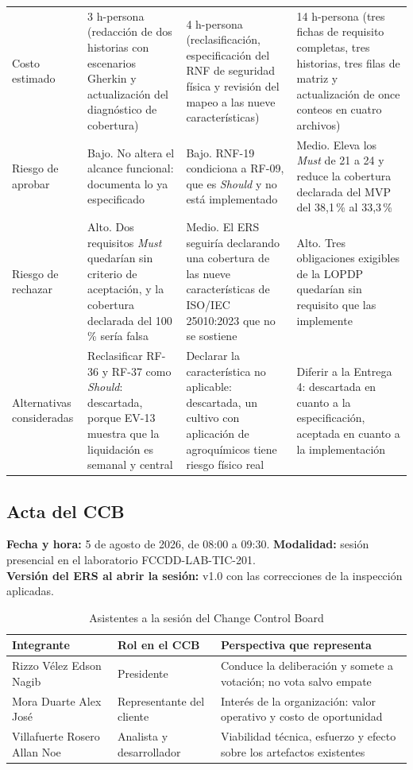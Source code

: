 \documentclass[11pt,letterpaper]{article}
\begin{document}
{\begin{longtable}{L{2.4cm} L{4.4cm} L{4.4cm} L{4.4cm}}
Costo estimado & 3 h-persona (redacción de dos historias con escenarios Gherkin y actualización del diagnóstico de cobertura) & 4 h-persona (reclasificación, especificación del RNF de seguridad física y revisión del mapeo a las nueve características) & 14 h-persona (tres fichas de requisito completas, tres historias, tres filas de matriz y actualización de once conteos en cuatro archivos)\\
Riesgo de aprobar & Bajo. No altera el alcance funcional: documenta lo ya especificado & Bajo. RNF-19 condiciona a RF-09, que es \emph{Should} y no está implementado & Medio. Eleva los \emph{Must} de 21 a 24 y reduce la cobertura declarada del MVP del 38,1\,\% al 33,3\,\%\\
Riesgo de rechazar & Alto. Dos requisitos \emph{Must} quedarían sin criterio de aceptación, y la cobertura declarada del 100\,\% sería falsa & Medio. El ERS seguiría declarando una cobertura de las nueve características de ISO/IEC 25010:2023 que no se sostiene & Alto. Tres obligaciones exigibles de la LOPDP quedarían sin requisito que las implemente\\
Alternativas consideradas & Reclasificar RF-36 y RF-37 como \emph{Should}: descartada, porque EV-13 muestra que la liquidación es semanal y central & Declarar la característica no aplicable: descartada, un cultivo con aplicación de agroquímicos tiene riesgo físico real & Diferir a la Entrega 4: descartada en cuanto a la especificación, aceptada en cuanto a la implementación\\
\end{longtable}}

\subsection{Acta del CCB}

\noindent\textbf{Fecha y hora:} 5 de agosto de 2026, de 08:00 a 09:30.
\textbf{Modalidad:} sesión presencial en el laboratorio FCCDD-LAB-TIC-201.\\
\textbf{Versión del ERS al abrir la sesión:} v1.0 con las correcciones de la inspección aplicadas.

\begin{table}[H]
\centering\footnotesize
\caption{Asistentes a la sesión del Change Control Board}
\begin{tabular}{L{4.4cm} L{3.4cm} L{7cm}}
\toprule
\textbf{Integrante} & \textbf{Rol en el CCB} & \textbf{Perspectiva que representa}\\
\midrule
Rizzo Vélez Edson Nagib & Presidente & Conduce la deliberación y somete a votación; no vota salvo empate\\
Mora Duarte Alex José & Representante del cliente & Interés de la organización: valor operativo y costo de oportunidad\\
Villafuerte Rosero Allan Noe & Analista y desarrollador & Viabilidad técnica, esfuerzo y efecto sobre los artefactos existentes\\
\bottomrule
\end{tabular}
\end{table}
\end{document}
